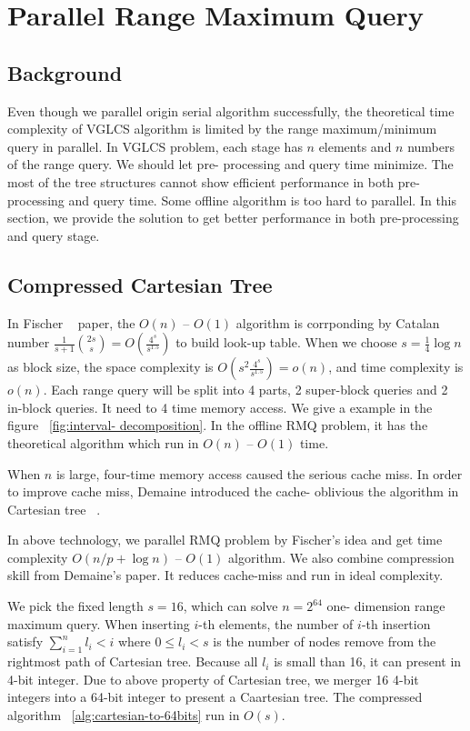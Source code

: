 \section{Parallel Range Maximum Query}
\label{sec:parallelRMQ}

\subsection{Background}

Even though we parallel origin serial algorithm successfully, the
theoretical time complexity of VGLCS algorithm is limited by the range
maximum/minimum query in parallel.  In VGLCS problem, each stage has
$n$ elements and $n$ numbers of the range query.  We should let pre-
processing and query time minimize.  The most of the tree structures
cannot show efficient performance in both pre-processing and query
time.  Some offline algorithm is too hard to parallel.  In this
section, we provide the solution to get better performance in both
pre-processing and query stage.

\subsection{Compressed Cartesian Tree}

In Fischer ~\cite{Fischer2006TheoreticalAP} paper, the $O(n)$ --
$O(1)$ algorithm is corrponding by Catalan number
$\frac{1}{s+1}\binom{2s}{s} = O(\frac{4^s}{s^{1.5}})$ to build look-up
table.  When we choose $s = \frac{1}{4} \log n$ as block size, the
space complexity is $O(s^2 \frac{4^s}{s^{1.5}}) = o(n)$, and time
complexity is $o(n)$.  Each range query will be split into 4 parts, 2
super-block queries and 2 in-block queries. It need to 4 time memory
access.  We give a example in the figure ~\ref{fig:interval-
decomposition}.  In the offline RMQ problem, it has the theoretical
algorithm which run in $O(n)$ -- $O(1)$ time.

When $n$ is large, four-time memory access caused the serious cache
miss. In order to improve cache miss, Demaine introduced the cache-
oblivious the algorithm in Cartesian tree ~\cite{Demaine2009OnCT}.

In above technology, we parallel RMQ problem by Fischer's idea and get
time complexity $O(n / p + \log n)$ -- $O(1)$ algorithm.  We also
combine compression skill from Demaine's paper. It reduces cache-miss
and run in ideal complexity.

We pick the fixed length $s = 16$, which can solve $n = 2^{64}$ one-
dimension range maximum query.  When inserting $i$-th elements, the
number of $i$-th insertion satisfy $\sum_{i=1}^{n} l_i < i$ where $0
\le l_i < s$ is the number of nodes remove from the rightmost path of
Cartesian tree.  Because all $l_i$ is small than 16, it can present in
4-bit integer.  Due to above property of Cartesian tree, we merger 16
4-bit integers into a 64-bit integer to present a Caartesian tree.
The compressed algorithm ~\ref{alg:cartesian-to-64bits} run in $O(s)$.

